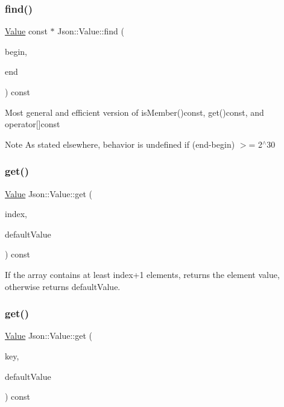 \subsubsection{\texorpdfstring{find()}{find()}}
{\footnotesize\ttfamily \hyperlink{classJson_1_1Value}{Value} const  $\ast$ Json\+::\+Value\+::find (\begin{DoxyParamCaption}\item[{char const $\ast$}]{begin,  }\item[{char const $\ast$}]{end }\end{DoxyParamCaption}) const}

Most general and efficient version of is\+Member()const, get()const, and operator\mbox{[}\mbox{]}const \begin{DoxyNote}{Note}
As stated elsewhere, behavior is undefined if (end-\/begin) $>$= 2$^\wedge$30 
\end{DoxyNote}
\mbox{\label{classJson_1_1Value_a034eb7bf85a44fa759bdaa232788ca66}} 
\subsubsection{\texorpdfstring{get()}{get()}\hspace{0.1cm}{\footnotesize\ttfamily [1/4]}}
{\footnotesize\ttfamily \hyperlink{classJson_1_1Value}{Value} Json\+::\+Value\+::get (\begin{DoxyParamCaption}\item[{Array\+Index}]{index,  }\item[{const \hyperlink{classJson_1_1Value}{Value} \&}]{default\+Value }\end{DoxyParamCaption}) const}

If the array contains at least index+1 elements, returns the element value, otherwise returns default\+Value. \mbox{\label{classJson_1_1Value_a57de86629ed23246f14014fb6c44fa67}} 
\subsubsection{\texorpdfstring{get()}{get()}\hspace{0.1cm}{\footnotesize\ttfamily [2/4]}}
{\footnotesize\ttfamily \hyperlink{classJson_1_1Value}{Value} Json\+::\+Value\+::get (\begin{DoxyParamCaption}\item[{const char $\ast$}]{key,  }\item[{const \hyperlink{classJson_1_1Value}{Value} \&}]{default\+Value }\end{DoxyParamCaption}) const}

